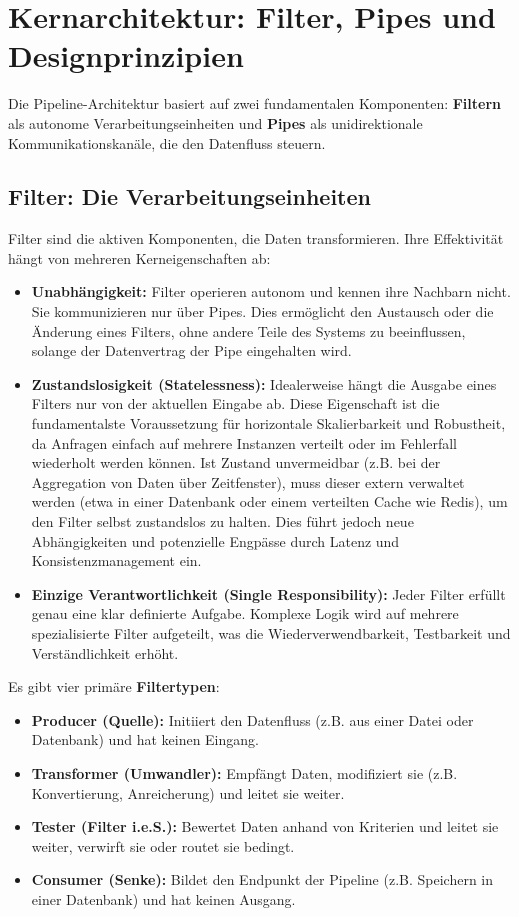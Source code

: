 \documentclass[10pt,a4paper]{article}
\begin{document}
\section{Kernarchitektur: Filter, Pipes und Designprinzipien}
Die Pipeline-Architektur basiert auf zwei fundamentalen Komponenten: \textbf{Filtern} als autonome Verarbeitungseinheiten und \textbf{Pipes} als unidirektionale Kommunikationskanäle, die den Datenfluss steuern.\cite{richards2020, oreilly_python_pipes}

\subsection{Filter: Die Verarbeitungseinheiten}
Filter sind die aktiven Komponenten, die Daten transformieren. Ihre Effektivität hängt von mehreren Kerneigenschaften ab:

\begin{itemize}
\item \textbf{Unabhängigkeit:} Filter operieren autonom und kennen ihre Nachbarn nicht. Sie kommunizieren nur über Pipes. Dies ermöglicht den Austausch oder die Änderung eines Filters, ohne andere Teile des Systems zu beeinflussen, solange der Datenvertrag der Pipe eingehalten wird.\cite{richards2020}
\item \textbf{Zustandslosigkeit (Statelessness):} Idealerweise hängt die Ausgabe eines Filters nur von der aktuellen Eingabe ab. Diese Eigenschaft ist die fundamentalste Voraussetzung für horizontale Skalierbarkeit und Robustheit, da Anfragen einfach auf mehrere Instanzen verteilt oder im Fehlerfall wiederholt werden können. Ist Zustand unvermeidbar (z.B. bei der Aggregation von Daten über Zeitfenster), muss dieser extern verwaltet werden (etwa in einer Datenbank oder einem verteilten Cache wie Redis), um den Filter selbst zustandslos zu halten. Dies führt jedoch neue Abhängigkeiten und potenzielle Engpässe durch Latenz und Konsistenzmanagement ein.\cite{researchgate_parallel_pipes}
\item \textbf{Einzige Verantwortlichkeit (Single Responsibility):} Jeder Filter erfüllt genau eine klar definierte Aufgabe. Komplexe Logik wird auf mehrere spezialisierte Filter aufgeteilt, was die Wiederverwendbarkeit, Testbarkeit und Verständlichkeit erhöht.\cite{richards2020}
\end{itemize}

Es gibt vier primäre \textbf{Filtertypen}:\cite{uqcloud_pipeline, richards2020}
\begin{itemize}
\item \textbf{Producer (Quelle):} Initiiert den Datenfluss (z.B. aus einer Datei oder Datenbank) und hat keinen Eingang.
\item \textbf{Transformer (Umwandler):} Empfängt Daten, modifiziert sie (z.B. Konvertierung, Anreicherung) und leitet sie weiter.
\item \textbf{Tester (Filter i.e.S.):} Bewertet Daten anhand von Kriterien und leitet sie weiter, verwirft sie oder routet sie bedingt.
\item \textbf{Consumer (Senke):} Bildet den Endpunkt der Pipeline (z.B. Speichern in einer Datenbank) und hat keinen Ausgang.
\end{itemize}
\end{document}
